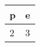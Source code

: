 \documentclass{article}[12pt]
\begin{document}
\centering
\begin{tabular}{ll}
p&e\\
\hline
2&3
\end{tabular}

  
\end{document}
